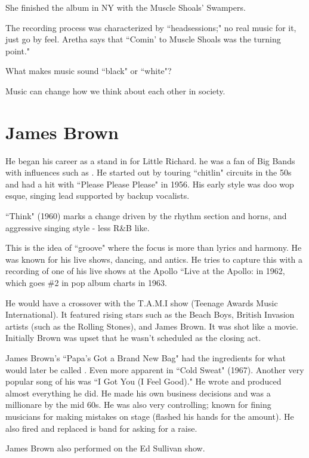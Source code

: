 \documentclass[12pt, a4paper, twoside, openright, titlepage]{book}
\begin{document}
She finished the album in NY with the Muscle Shoals' Swampers.

The recording process was characterized by ``headsessions;" no real music for it, just go by feel. Aretha says that ``Comin' to Muscle Shoals was the turning point."


\begin{qst}{}{}
    What makes music sound ``black" or ``white"?
\end{qst}

Music can change how we think about each other in society.


\section{James Brown}

He began his career as a stand in for Little Richard. he was a fan of Big Bands with influences such as . He started out by touring ``chitlin" circuits in the 50s and had a hit with ``Please Please Please" in 1956. His early style was doo wop esque, singing lead supported by backup vocalists. 

``Think" (1960) marks a change driven by the rhythm section and horns, and aggressive singing style - less R\&B like.

This is the idea of ``groove" where the focus is more than lyrics and harmony. He was known for his live shows, dancing, and antics. He tries to capture this with a recording of one of his live shows at the Apollo ``Live at the Apollo: in 1962, which goes \#2 in pop album charts in 1963.

He would have a crossover with the T.A.M.I show (Teenage Awards Music International). It featured rising stars such as the Beach Boys, British Invasion artists (such as the Rolling Stones), and James Brown. It was shot like a movie. Initially Brown was upset that he wasn't scheduled as the closing act.


James Brown's ``Papa's Got a Brand New Bag" had the ingredients for what would later be called . Even more apparent in ``Cold Sweat" (1967). Another very popular song of his was ``I Got You (I Feel Good)." He wrote and produced almost everything he did. He made his own business decisions and was a millionare by the mid 60s. He was also very controlling; known for fining musicians for making mistakes on stage (flashed his hands for the amount). He also fired and replaced is band for asking for a raise.


James Brown also performed on the Ed Sullivan show.
\end{document}
